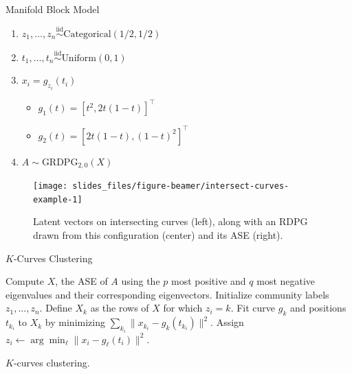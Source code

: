 \documentclass[
  ignorenonframetext,
]{beamer}
\providecommand{\tightlist}{%
  \setlength{\itemsep}{0pt}\setlength{\parskip}{0pt}}
\begin{document}
\begin{frame}{Manifold Block Model}
\protect\hypertarget{manifold-block-model-1}{}
\begin{enumerate}
\tightlist
\item
  \(z_1, ..., z_n \stackrel{\text{iid}}{\sim}\text{Categorical}(1/2, 1/2)\)
\item
  \(t_1, ..., t_n \stackrel{\text{iid}}{\sim}\text{Uniform}(0, 1)\)
\item
  \(x_i = g_{z_i}(t_i)\)

  \begin{itemize}
  \tightlist
  \item
    \(g_1(t) = [t^2, 2 t (1-t)]^\top\)
  \item
    \(g_2(t) = [2 t (1-t), (1-t)^2]^\top\)
  \end{itemize}
\item
  \(A \sim \text{GRDPG}_{2, 0}(X)\)
\end{enumerate}

\begin{figure}

{\centering \texttt{[image: slides\_files/figure-beamer/intersect-curves-example-1]} 

}

\caption{Latent vectors on intersecting curves (left), along with an RDPG drawn from this configuration (center) and its ASE (right).}\label{intersect-curves-example}
\end{figure}
\end{frame}

\begin{frame}{\(K\)-Curves Clustering}
\protect\hypertarget{k-curves-clustering}{}
\begin{algorithm}[H]
\label{alg:kcurves}
\scriptsize
\DontPrintSemicolon
\SetAlgoLined
{}
Compute $X$, the ASE of $A$ using the $p$ most positive and $q$ most negative eigenvalues and their corresponding eigenvectors.\;
Initialize community labels $z_1, ..., z_n$.\;
 {
 {
Define $X_k$ as the rows of $X$ for which $z_i = k$.\;
Fit curve $g_k$ and positions $t_{k_i}$ to $X_k$ by minimizing $\sum_{k_i} \|x_{k_i} - g_k(t_{k_i})\|^2$.\;
}
 {
Assign $z_i \leftarrow \arg\min_\ell \|x_i - g_\ell(t_i)\|^2$.\;
}
}
\caption{$K$-curves clustering.}
\end{algorithm}
\end{frame}
\end{document}

